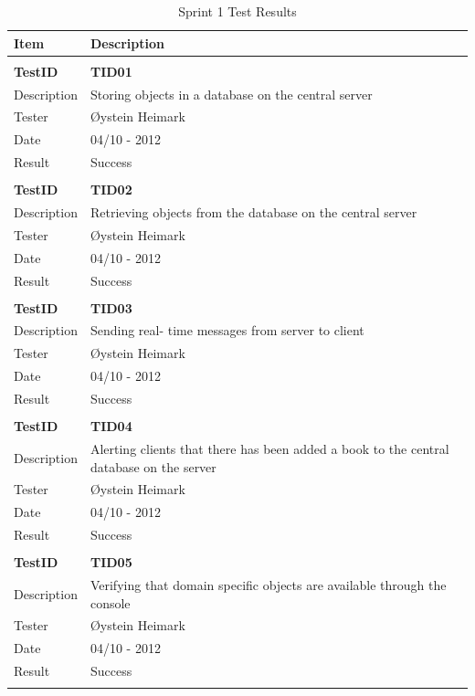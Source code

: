 \begin{table}
\caption{Sprint 1 Test Results}
\centering
\begin{tabular}{ l p{13cm} }

\hline 
Item			&Description		\\
\hline \\ [-2.0ex]

\bf{TestID}		&\bf{TID01}			\\
Description	&Storing objects in a database on the central server	\\
Tester		&Øystein Heimark	\\
Date			&04/10 - 2012	\\
Result		&Success				\\
\hline \\ [-2.0ex]

\bf{TestID}		&\bf{TID02}			\\
Description	&Retrieving objects from the database on the central server	\\
Tester		&Øystein Heimark	\\
Date			&04/10 - 2012	\\
Result		&Success			\\
\hline \\ [-2.0ex]

\bf{TestID}		&\bf{TID03}			\\
Description	&Sending real- time messages from server to client	\\
Tester		&Øystein Heimark	\\
Date			&04/10 - 2012	\\
Result		&Success				\\
\hline \\ [-2.0ex]

\bf{TestID}		&\bf{TID04}			\\
Description	&Alerting clients that there has been added a book to the central database on the server	\\
Tester		&Øystein Heimark	\\
Date			&04/10 - 2012	\\
Result		&Success				\\
\hline \\ [-2.0ex]

\bf{TestID}		&\bf{TID05}			\\
Description	&Verifying that domain specific objects are available through the console	\\
Tester		&Øystein Heimark	\\
Date			&04/10 - 2012	\\
Result		&Success				\\
\hline \\ [-2.0ex]


\end{tabular}
\end{table}
